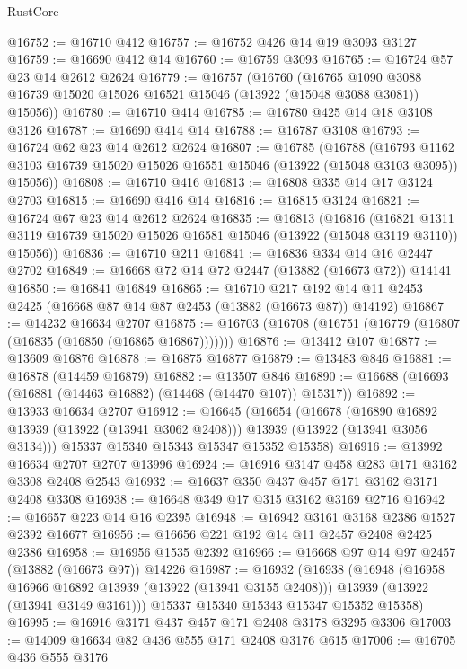 \begin{lexlean}{RustCore}
\begin{coremodule}
@16752 := @16710 @412
@16757 := @16752 @426 @14 @19 @3093 @3127
@16759 := @16690 @412 @14
@16760 := @16759 @3093
@16765 := @16724 @57 @23 @14 @2612 @2624
@16779 := @16757
    (@16760
      (@16765 @1090 @3088 @16739 @15020 @15026 @16521 @15046 (@13922 (@15048 @3088 @3081)) @15056))
@16780 := @16710 @414
@16785 := @16780 @425 @14 @18 @3108 @3126
@16787 := @16690 @414 @14
@16788 := @16787 @3108
@16793 := @16724 @62 @23 @14 @2612 @2624
@16807 := @16785
    (@16788
      (@16793 @1162 @3103 @16739 @15020 @15026 @16551 @15046 (@13922 (@15048 @3103 @3095)) @15056))
@16808 := @16710 @416
@16813 := @16808 @335 @14 @17 @3124 @2703
@16815 := @16690 @416 @14
@16816 := @16815 @3124
@16821 := @16724 @67 @23 @14 @2612 @2624
@16835 := @16813
    (@16816
      (@16821 @1311 @3119 @16739 @15020 @15026 @16581 @15046 (@13922 (@15048 @3119 @3110)) @15056))
@16836 := @16710 @211
@16841 := @16836 @334 @14 @16 @2447 @2702
@16849 := @16668 @72 @14 @72 @2447 (@13882 (@16673 @72)) @14141
@16850 := @16841 @16849
@16865 := @16710
    @217
    @192
    @14
    @11
    @2453
    @2425
    (@16668 @87 @14 @87 @2453 (@13882 (@16673 @87)) @14192)
@16867 := @14232 @16634 @2707
@16875 := @16703 (@16708 (@16751 (@16779 (@16807 (@16835 (@16850 (@16865 @16867)))))))
@16876 := @13412 @107
@16877 := @13609 @16876
@16878 := @16875 @16877
@16879 := @13483 @846
@16881 := @16878 (@14459 @16879)
@16882 := @13507 @846
@16890 := @16688 (@16693 (@16881 (@14463 @16882) (@14468 (@14470 @107)) @15317))
@16892 := @13933 @16634 @2707
@16912 := @16645
    (@16654
      (@16678
        (@16890 @16892 @13939 (@13922 (@13941 @3062 @2408)))
        @13939
        (@13922 (@13941 @3056 @3134)))
      @15337
      @15340
      @15343
      @15347
      @15352
      @15358)
@16916 := @13992 @16634 @2707 @2707 @13996
@16924 := @16916 @3147 @458 @283 @171 @3162 @3308 @2408 @2543
@16932 := @16637 @350 @437 @457 @171 @3162 @3171 @2408 @3308
@16938 := @16648 @349 @17 @315 @3162 @3169 @2716
@16942 := @16657 @223 @14 @16 @2395
@16948 := @16942 @3161 @3168 @2386 @1527 @2392 @16677
@16956 := @16656 @221 @192 @14 @11 @2457 @2408 @2425 @2386
@16958 := @16956 @1535 @2392
@16966 := @16668 @97 @14 @97 @2457 (@13882 (@16673 @97)) @14226
@16987 := @16932
    (@16938
      (@16948
        (@16958 @16966 @16892 @13939 (@13922 (@13941 @3155 @2408)))
        @13939
        (@13922 (@13941 @3149 @3161)))
      @15337
      @15340
      @15343
      @15347
      @15352
      @15358)
@16995 := @16916 @3171 @437 @457 @171 @2408 @3178 @3295 @3306
@17003 := @14009 @16634 @82 @436 @555 @171 @2408 @3176 @615
@17006 := @16705 @436 @555 @3176

\end{coremodule}
\end{lexlean}
